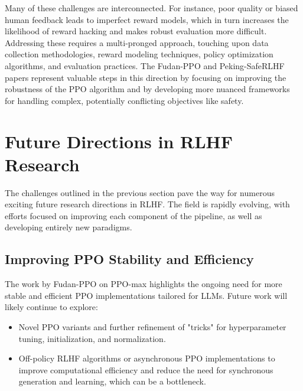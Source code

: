 \documentclass[10pt,journal,compsoc]{IEEEtran} %
\begin{document}
Many of these challenges are interconnected. For instance, poor quality or biased human feedback leads to imperfect reward models, which in turn increases the likelihood of reward hacking and makes robust evaluation more difficult. Addressing these requires a multi-pronged approach, touching upon data collection methodologies, reward modeling techniques, policy optimization algorithms, and evaluation practices. The Fudan-PPO and Peking-SafeRLHF papers represent valuable steps in this direction by focusing on improving the robustness of the PPO algorithm and by developing more nuanced frameworks for handling complex, potentially conflicting objectives like safety.

\section{Future Directions in RLHF Research}
\label{sec:future_directions}

The challenges outlined in the previous section pave the way for numerous exciting future research directions in RLHF. The field is rapidly evolving, with efforts focused on improving each component of the pipeline, as well as developing entirely new paradigms.

\subsection{Improving PPO Stability and Efficiency}
The work by Fudan-PPO on PPO-max \cite{Zheng2023PPO} highlights the ongoing need for more stable and efficient PPO implementations tailored for LLMs. Future work will likely continue to explore:
\begin{itemize}
    \item Novel PPO variants and further refinement of "tricks" for hyperparameter tuning, initialization, and normalization.
    \item Off-policy RLHF algorithms or asynchronous PPO implementations to improve computational efficiency and reduce the need for synchronous generation and learning, which can be a bottleneck. \cite{Tang2024AsyncRLHF}
\end{itemize}
\end{document}
